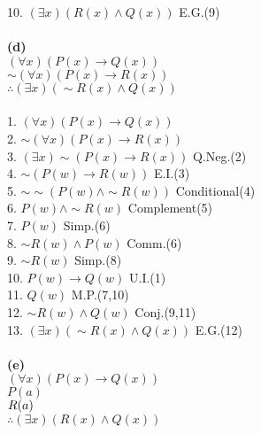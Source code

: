 \documentclass{article}
\begin{document}
10. $(\exists x)(R(x) \wedge Q(x))$ \hspace*{\fill} E.G.(9) \\\\
\textbf{(d)} \\ 
$(\forall x)(P(x) \rightarrow Q(x))$ \\
\underline{$\sim (\forall x)(P(x) \rightarrow R(x))$} \\
$\therefore (\exists x)(\sim R(x) \wedge Q(x))$ \\ \\
1. $(\forall x)(P(x) \rightarrow Q(x))$ \\
2. $\sim (\forall x)(P(x) \rightarrow R(x))$ \\
3. $(\exists x) \sim (P(x) \rightarrow R(x))$ \hspace*{\fill} Q.Neg.(2) \\
4. $\sim (P(w) \rightarrow R(w))$ \hspace*{\fill} E.I.(3) \\
5. $\sim \sim (P(w) \wedge \sim R(w))$ \hspace*{\fill} Conditional(4) \\
6. $P(w) \wedge \sim R(w)$ \hspace*{\fill} Complement(5) \\
7. $P(w)$ \hspace*{\fill} Simp.(6) \\
8. $\sim R(w) \wedge P(w)$ \hspace*{\fill} Comm.(6) \\
9. $\sim R(w)$ \hspace*{\fill} Simp.(8) \\
10. $P(w) \rightarrow Q(w)$ \hspace*{\fill} U.I.(1) \\
11. $Q(w)$ \hspace*{\fill} M.P.(7,10) \\
12. $\sim R(w) \wedge Q(w)$ \hspace*{\fill} Conj.(9,11) \\
13. $(\exists x)(\sim R(x) \wedge Q(x))$ \hspace*{\fill} E.G.(12) \\ \\
\textbf{(e)} \\ 
$(\forall x)(P(x) \rightarrow Q(x))$ \\
$P(a)$ \\
\underline{$R(a)\hspace{2.75cm}$} \\
$\therefore (\exists x)(R(x) \wedge Q(x))$ \\\\
\end{document}
